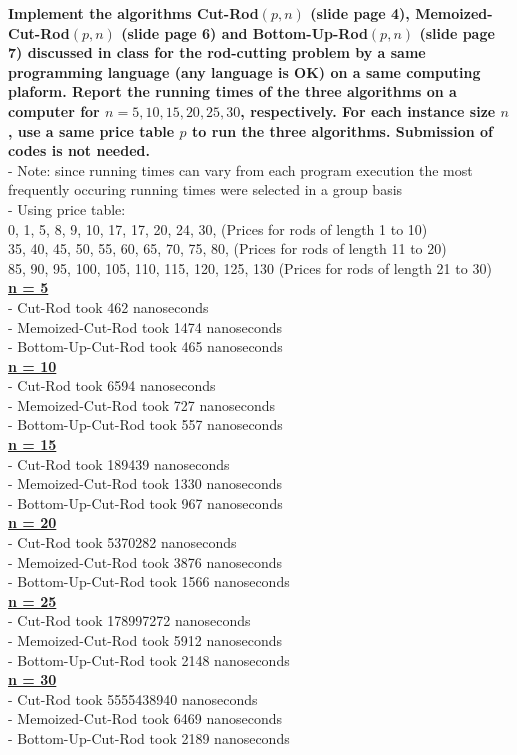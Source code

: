 \documentclass[letterpaper,12pt]{article}
\begin{document}
\begin{enumerate}
\textbf{Implement the algorithms Cut-Rod$(p,n)$ (slide page 4), Memoized-Cut-Rod$(p,n)$
(slide page 6) and Bottom-Up-Rod$(p,n)$ (slide page 7) discussed in class for the
rod-cutting problem by a same programming language (any language is OK) on a same
computing plaform. Report the running times of the three algorithms on a computer
for $n=5,10,15,20,25,30$, respectively. For each instance size $n$, use a same price
table $p$ to run the three algorithms. Submission of codes is not needed.} \\
- Note: since running times can vary from each program execution the most frequently occuring running times were selected in a group basis \\
- Using price table: \\
0, 1, 5, 8, 9, 10, 17, 17, 20, 24, 30, (Prices for rods of length 1 to 10) \\
35, 40, 45, 50, 55, 60, 65, 70, 75, 80, (Prices for rods of length 11 to 20) \\
85, 90, 95, 100, 105, 110, 115, 120, 125, 130 (Prices for rods of length 21 to 30) \\

\underline{\textbf{n = 5}}  \\
- Cut-Rod took 462 nanoseconds \\
- Memoized-Cut-Rod took 1474 nanoseconds \\
- Bottom-Up-Cut-Rod took 465 nanoseconds \\
\underline{\textbf{n = 10}} \\
- Cut-Rod took 6594 nanoseconds \\
- Memoized-Cut-Rod took 727 nanoseconds \\
- Bottom-Up-Cut-Rod took 557 nanoseconds \\
\underline{\textbf{n = 15}} \\
- Cut-Rod took 189439 nanoseconds \\
- Memoized-Cut-Rod took 1330 nanoseconds \\
- Bottom-Up-Cut-Rod took 967 nanoseconds \\
\underline{\textbf{n = 20}} \\
- Cut-Rod took 5370282 nanoseconds \\
- Memoized-Cut-Rod took 3876 nanoseconds \\
- Bottom-Up-Cut-Rod took 1566 nanoseconds \\
\underline{\textbf{n = 25}} \\
- Cut-Rod took 178997272 nanoseconds \\
- Memoized-Cut-Rod took 5912 nanoseconds \\
- Bottom-Up-Cut-Rod took 2148 nanoseconds \\
\underline{\textbf{n = 30}} \\
- Cut-Rod took 5555438940 nanoseconds \\
- Memoized-Cut-Rod took 6469 nanoseconds \\
- Bottom-Up-Cut-Rod took 2189 nanoseconds \\



\end{enumerate}
\end{document}
